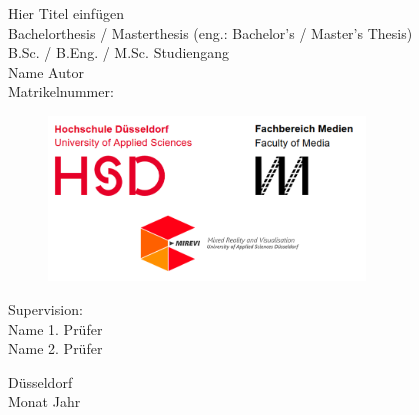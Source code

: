 
\begin{titlepage}
\begin{center}
	\vspace*{1.7cm}	
	\huge Hier Titel einfügen \\
	\vspace*{1.0cm}
	\Large Bachelorthesis / Masterthesis (eng.: Bachelor's / Master's Thesis)\\B.Sc. / B.Eng. / M.Sc. Studiengang\\Name Autor\\Matrikelnummer:
	
	\vspace{2.0cm}
	
	\begin{figure}[htb]
		\begin{center}
			\includegraphics[width=0.75\textwidth]{03_GraphicFiles/title_Logos.png}
		\end{center}
	\end{figure}
	\vspace{0.9cm}
	\Large Supervision: \\ 
	\Large Name 1. Prüfer \\
	\Large Name 2. Prüfer
	
	\vspace{1.5cm}
	\Large D\"usseldorf\\
	\Large Monat Jahr\\
\end{center}
\end{titlepage}
